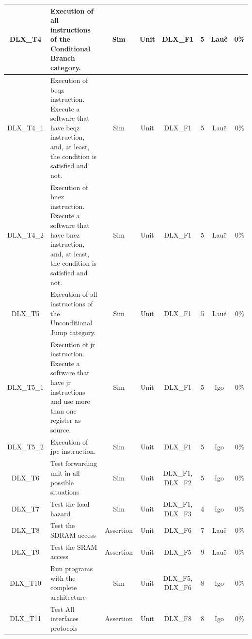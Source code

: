 \documentclass{article}
\begin{document}
\begin{landscape}
\begin{center}
\begin{longtable}[pos]{| c | m{5cm} | c | c | c | c | c | c |}
      	DLX\_T4      & Execution of all instructions of the Conditional Branch category.   &	Sim & Unit & DLX\_F1 & 5 & Lauê & 0\% \\ \hline 
      	DLX\_T4\_1   & Execution of beqz instruction. Execute a software that have beqz instruction, and, at least, the condition is satisfied and not.   &	Sim & Unit & DLX\_F1 & 5 & Lauê & 0\% \\ \hline   
      	DLX\_T4\_2   & Execution of bnez instruction. Execute a software that have bnez instruction, and, at least, the condition is satisfied and not.   &	Sim & Unit & DLX\_F1 & 5 & Lauê & 0\% \\ \hline   
      	DLX\_T5      & Execution of all instructions of the Unconditional Jump category.  &	Sim & Unit & DLX\_F1 & 5 & Lauê & 0\% \\ \hline 
       	DLX\_T5\_1   & Execution of jr instruction. Execute a software that have jr instructions and use more than one register as source.   &	Sim & Unit & DLX\_F1 & 5 & Igo & 0\% \\ \hline   
       	DLX\_T5\_2   & Execution of jpc instruction.  &	Sim & Unit & DLX\_F1 & 5 & Igo & 0\% \\ \hline   
	DLX\_T6      & Test forwarding unit in all possible situations  &	Sim & Unit & DLX\_F1, DLX\_F2 & 5 & Igo & 0\% \\ \hline   
	DLX\_T7      & Test the load hazard  &	Sim & Unit & DLX\_F1, DLX\_F3 & 4 & Igo & 0\% \\ \hline   
	DLX\_T8      & Test the SDRAM access  &	Assertion & Unit & DLX\_F6 & 7 & Lauê & 0\% \\ \hline        
	DLX\_T9      & Test the SRAM access  &	Assertion & Unit & DLX\_F5 & 9 & Lauê & 0\% \\ \hline        
	DLX\_T10      & Run programs with the complete architecture  &	Sim & Unit & DLX\_F5, DLX\_F6 & 8 & Igo & 0\% \\ \hline        
	DLX\_T11      & Test All interfaces protocols  & Assertion & Unit & DLX\_F8 & 8 & Igo & 0\% \\ \hline        

      \end{longtable}
    \end{center}		
  \end{landscape}
  
  \newpage
\end{document}
